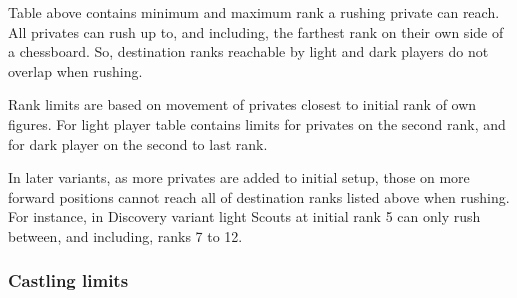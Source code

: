 Table above contains minimum and maximum rank a rushing private can reach. All
privates can rush up to, and including, the farthest rank on their own side of
a chessboard. So, destination ranks reachable by light and dark players do not
overlap when rushing.

Rank limits are based on movement of privates closest to initial rank of own
figures. For light player table contains limits for privates on the second rank,
and for dark player on the second to last rank.

In later variants, as more privates are added to initial setup, those on more
forward positions cannot reach all of destination ranks listed above when rushing.\newline
\indent
For instance, in Discovery variant light Scouts at initial rank 5 can only rush
between, and including, ranks 7 to 12.

\clearpage %

\subsubsection*{Castling limits}
\label{sec:Appendix/Summary/Movement limits/Castling limits}

